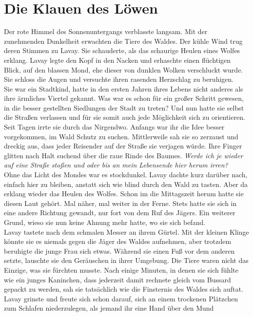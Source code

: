 \chapter{Die Klauen des Löwen}

Der rote Himmel des Sonnenuntergangs verblasste langsam. Mit der zunehmenden Dunkelheit erwachten 
die Tiere des Waldes. Der kühle Wind trug deren Stimmen zu Lavay. Sie schauderte, als das schaurige 
Heulen eines Wolfes erklang. Lavay legte den Kopf in den Nacken und erhaschte einen flüchtigen 
Blick, auf den blassen Mond, ehe dieser von dunklen Wolken verschluckt wurde. Sie schloss die Augen 
und versuchte ihren rasenden Herzschlag zu beruhigen.\\
Sie war ein Stadtkind, hatte in den ersten Jahren ihres Lebens nicht anderes als ihre ärmliches 
Viertel gekannt. Was war es schon für ein großer Schritt gewesen, in die besser gestellten 
Siedlungen der Stadt zu treten? Und nun hatte sie selbst die Straßen verlassen und für sie somit 
auch jede Möglichkeit sich zu orientieren. Seit Tagen irrte sie durch das Nirgendwo. Anfangs war 
ihr die Idee besser vorgekommen, im Wald Schutz zu suchen. Mittlerweile sah sie so zerzaust und 
dreckig aus, dass jeder Reisender auf der Straße sie verjagen würde. Ihre Finger glitten nach Halt 
suchend über die raue Rinde des Baumes. \textit{Werde ich je wieder auf eine Straße stoßen und oder 
bis an mein Lebensende hier herum irren?}\\
Ohne das Licht des Mondes war es stockdunkel. Lavay dachte kurz darüber nach, einfach hier zu 
bleiben, anstatt sich wie blind durch den Wald zu tasten. Aber da erklang wieder das Heulen des 
Wolfes. Schon im die Mittagszeit herum hatte sie diesen Laut gehört. Mal näher, mal weiter in der 
Ferne. Stets hatte sie sich in eine andere Richtung gewandt, nur fort von dem Ruf des Jägers. Ein 
weiterer Grund, wieso sie nun keine Ahnung mehr hatte, wo sie sich befand.\\ 
Lavay tastete nach dem schmalen Messer an ihrem Gürtel. Mit der kleinen Klinge könnte sie es niemals 
gegen die Jäger des Waldes aufnehmen, aber trotzdem beruhigte die junge Frau sich etwas. Während 
sie einen Fuß vor dem anderen setzte, lauschte sie den Geräuschen in ihrer Umgebung. Die Tiere 
waren nicht das Einzige, was sie fürchten musste. Nach einige Minuten, in denen sie sich fühlte wie 
ein junges Kaninchen, dass jederzeit damit rechnete gleich vom Bussard gepackt zu werden, sah sie 
tatsächlich wie die Finsternis des Waldes sich auftat. Lavay grinste und freute sich schon darauf, 
sich an einem trockenen Plätzchen zum Schlafen niederzulegen, als jemand ihr eine Hand über den Mund 
